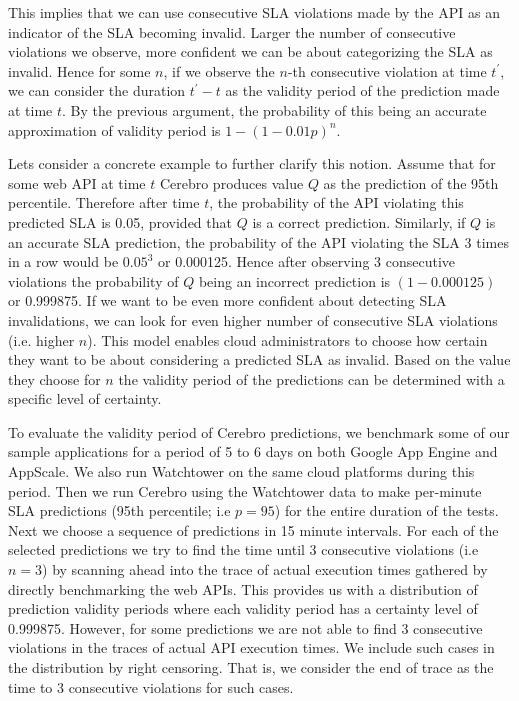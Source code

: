 This implies that we can use consecutive SLA violations made by the API as an indicator of the SLA becoming
invalid. Larger the number of consecutive violations we observe, more confident we can be about categorizing the SLA as invalid. 
Hence for some $n$, if we observe
the $n$-th consecutive violation at time $t^\prime$, we can consider the duration $t^\prime - t$ as the validity period of the prediction made 
at time $t$. By the previous argument, the probability of this being an accurate approximation of validity period is $1 - (1-0.01p)^n$.

Lets consider a concrete example to further clarify this notion. Assume that for some web API at time $t$ Cerebro produces value $Q$ as the 
prediction of the 95th percentile. Therefore after time $t$, the probability of the API violating this predicted SLA is 0.05, provided
that $Q$ is a correct prediction. Similarly, if $Q$ is an accurate SLA prediction, the probability of the API
violating the SLA 3 times in a row would be $0.05^3$ or 0.000125. Hence after observing 3 consecutive violations the probability of $Q$
being an incorrect prediction is $(1 - 0.000125)$ or 0.999875. If we want to be even more confident about detecting SLA invalidations, 
we can look for even higher
number of consecutive SLA violations (i.e. higher $n$). This model enables cloud administrators to choose how certain they want to be about
considering a predicted SLA as invalid. Based on the value they choose for $n$ the validity period of the predictions can be determined
with a specific level of certainty.

To evaluate the validity period of Cerebro predictions, we benchmark some of our sample applications for a period of 5 to 6 days on both
Google App Engine and AppScale. We also run Watchtower on the same cloud platforms during this period. Then we run Cerebro using
the Watchtower data to make per-minute SLA predictions (95th percentile; i.e $p=95$) for the entire duration of the tests. Next we choose a sequence of predictions
in 15 minute intervals. For each of the selected predictions we try to find the time until 3 consecutive violations (i.e $n=3$) by scanning ahead into the trace of
actual execution times gathered by directly benchmarking the web APIs. This provides us with a distribution of prediction validity periods where
each validity period has a certainty level of 0.999875.
However, for some predictions we are not able to find 3 consecutive violations in the traces of actual API execution times. We include
such cases in the distribution by right censoring. That is, we consider the end of trace as the time to 3 consecutive violations for such cases.

